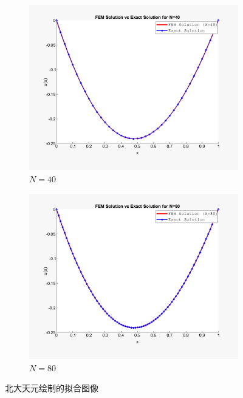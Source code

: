 \documentclass[11pt]{ctexart}
\begin{document}
\begin{figure}[h]
    \vspace{0.5em}
    
    \begin{subfigure}{0.4\textwidth}
        \centering
        \includegraphics[width=\linewidth]{40.png}
        \caption{$ N=40 $ }
        \label{fig:sub3}
    \end{subfigure}
    \begin{subfigure}{0.4\textwidth}
        \centering
        \includegraphics[width=\linewidth]{80.png}
        \caption{$ N=80 $ }
        \label{fig:sub4}
    \end{subfigure}
    
    \caption{北大天元绘制的拟合图像}
    \label{fig:fit}
\end{figure}
\end{document}
